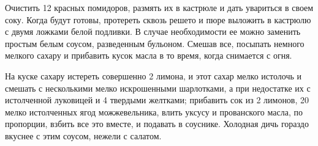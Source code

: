 Очистить 12 красных помидоров, размять их в кастрюле и дать увариться в своем соку. Когда будут готовы, протереть сквозь решето и пюре выложить в кастрюлю с двумя ложками белой подливки. В случае необходимости ее можно заменить простым белым соусом, разведенным бульоном. Смешав все, посыпать немного мелкого сахару и прибавить кусок масла в то время, когда снимается с огня. 


На куске сахару истереть совершенно 2 лимона, и этот сахар мелко истолочь и смешать с несколькими мелко искрошенными шарлотками, а при недостатке их с истолченной луковицей и 4 твердыми желтками; прибавить сок из 2 лимонов, 20 мелко истолченных ягод можжевельника, влить уксусу и прованского масла, по пропорции, взбить все это вместе, и подавать в соуснике. Холодная дичь гораздо вкуснее с этим соусом, нежели с салатом. 
